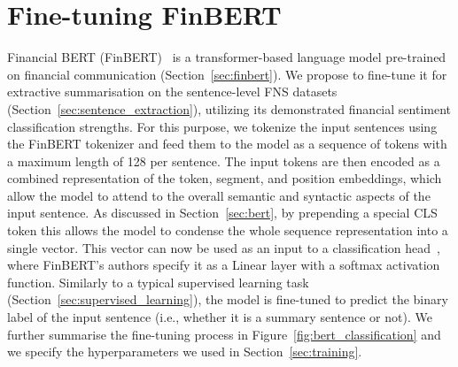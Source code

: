 \section{Fine-tuning FinBERT}\label{sec:finbert_finetuning}
Financial BERT (FinBERT)~\cite{yang2020finbert} is a transformer-based language model pre-trained on financial communication (Section~\ref{sec:finbert}).
We propose to fine-tune it for extractive summarisation on the sentence-level FNS datasets (Section~\ref{sec:sentence_extraction}), utilizing its demonstrated financial sentiment classification strengths.
For this purpose, we tokenize the input sentences using the FinBERT tokenizer and feed them to the model as a sequence of tokens with a maximum length of 128 per sentence.
The input tokens are then encoded as a combined representation of the token, segment, and position embeddings,
which allow the model to attend to the overall semantic and syntactic aspects of the input sentence.
As discussed in Section~\ref{sec:bert}, by prepending a special CLS token this allows the model to condense the whole sequence representation into a single vector.
This vector can now be used as an input to a classification head~\cite{jurafsky2000}, where FinBERT's authors specify it as a Linear layer with a softmax activation function.
Similarly to a typical supervised learning task (Section~\ref{sec:supervised_learning}), the model is fine-tuned to predict the binary label of the input sentence (i.e., whether it is a summary sentence or not).
We further summarise the fine-tuning process in Figure~\ref{fig:bert_classification} and we specify the hyperparameters we used in Section~\ref{sec:training}.

